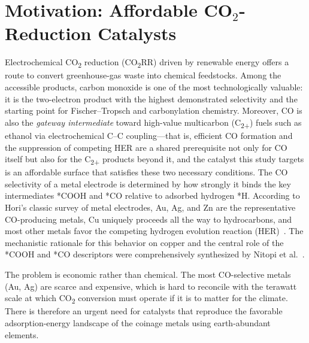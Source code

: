 \documentclass[11pt,a4paper]{report}
\begin{document}
\section{Motivation: Affordable CO\texorpdfstring{$_2$}{2}-Reduction Catalysts}
Electrochemical CO\textsubscript{2} reduction (CO\textsubscript{2}RR) driven by renewable energy offers a route to convert greenhouse-gas waste into chemical feedstocks. Among the accessible products, carbon monoxide is one of the most technologically valuable: it is the two-electron product with the highest demonstrated selectivity and the starting point for Fischer--Tropsch and carbonylation chemistry. Moreover, CO is also the \emph{gateway intermediate} toward high-value multicarbon (C\textsubscript{2+}) fuels such as ethanol via electrochemical C--C coupling---that is, efficient CO formation and the suppression of competing HER are a shared prerequisite not only for CO itself but also for the C\textsubscript{2+} products beyond it, and the catalyst this study targets is an affordable surface that satisfies these two necessary conditions. The CO selectivity of a metal electrode is determined by how strongly it binds the key intermediates \mbox{*COOH} and *CO relative to adsorbed hydrogen *H. According to Hori's classic survey of metal electrodes, Au, Ag, and Zn are the representative CO-producing metals, Cu uniquely proceeds all the way to hydrocarbons, and most other metals favor the competing hydrogen evolution reaction (HER)~\cite{hori2008}. The mechanistic rationale for this behavior on copper and the central role of the *COOH and *CO descriptors were comprehensively synthesized by Nitopi et al.~\cite{nitopi2019}.

The problem is economic rather than chemical. The most CO-selective metals (Au, Ag) are scarce and expensive, which is hard to reconcile with the terawatt scale at which CO\textsubscript{2} conversion must operate if it is to matter for the climate. There is therefore an urgent need for catalysts that reproduce the favorable adsorption-energy landscape of the coinage metals using earth-abundant elements.
\end{document}
